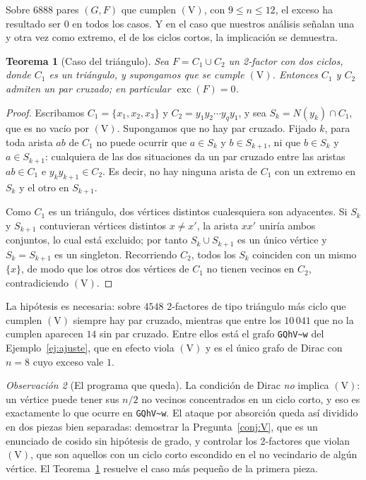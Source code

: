 \documentclass[11pt,a4paper]{article}
\newtheorem{teorema}{Teorema}[section]
\theoremstyle{definition}
\theoremstyle{remark}
\newtheorem{observacion}[teorema]{Observación}
\begin{document}
Sobre $6888$ pares $(G,F)$ que cumplen $(\mathrm{V})$, con $9\le n\le12$, el exceso ha resultado ser $0$ en todos los casos. Y en el caso que nuestros análisis señalan una y otra vez como extremo, el de los ciclos cortos, la implicación se demuestra.

\begin{teorema}[Caso del triángulo]\label{thm:triangulocosido}
Sea $F=C_1\cup C_2$ un 2-factor con dos ciclos, donde $C_1$ es un triángulo, y supongamos que se cumple $(\mathrm{V})$. Entonces $C_1$ y $C_2$ admiten un par cruzado; en particular $\operatorname{exc}(F)=0$.
\end{teorema}

\begin{proof}
Escribamos $C_1=\{x_1,x_2,x_3\}$ y $C_2=y_1y_2\cdots y_qy_1$, y sea $S_k=N(y_k)\cap C_1$, que es no vacío por $(\mathrm{V})$. Supongamos que no hay par cruzado. Fijado $k$, para toda arista $ab$ de $C_1$ no puede ocurrir que $a\in S_k$ y $b\in S_{k+1}$, ni que $b\in S_k$ y $a\in S_{k+1}$: cualquiera de las dos situaciones da un par cruzado entre las aristas $ab\in C_1$ e $y_ky_{k+1}\in C_2$. Es decir, no hay ninguna arista de $C_1$ con un extremo en $S_k$ y el otro en $S_{k+1}$.

Como $C_1$ es un triángulo, dos vértices distintos cualesquiera son adyacentes. Si $S_k$ y $S_{k+1}$ contuvieran vértices distintos $x\neq x'$, la arista $xx'$ uniría ambos conjuntos, lo cual está excluido; por tanto $S_k\cup S_{k+1}$ es un único vértice y $S_k=S_{k+1}$ es un singleton. Recorriendo $C_2$, todos los $S_k$ coinciden con un mismo $\{x\}$, de modo que los otros dos vértices de $C_1$ no tienen vecinos en $C_2$, contradiciendo $(\mathrm{V})$.
\end{proof}

La hipótesis es necesaria: sobre $4548$ 2-factores de tipo triángulo más ciclo que cumplen $(\mathrm{V})$ siempre hay par cruzado, mientras que entre los $10\,041$ que no la cumplen aparecen $14$ sin par cruzado. Entre ellos está el grafo \texttt{GQhV\~{}w} del Ejemplo~\ref{ej:ajuste}, que en efecto viola $(\mathrm{V})$ y es el único grafo de Dirac con $n=8$ cuyo exceso vale $1$.

\begin{observacion}[El programa que queda]\label{obs:programa}
La condición de Dirac \emph{no} implica $(\mathrm{V})$: un vértice puede tener sus $n/2$ no vecinos concentrados en un ciclo corto, y eso es exactamente lo que ocurre en \texttt{GQhV\~{}w}. El ataque por absorción queda así dividido en dos piezas bien separadas: demostrar la Pregunta~\ref{conj:V}, que es un enunciado de cosido sin hipótesis de grado, y controlar los 2-factores que violan $(\mathrm{V})$, que son aquellos con un ciclo corto escondido en el no vecindario de algún vértice. El Teorema~\ref{thm:triangulocosido} resuelve el caso más pequeño de la primera pieza.
\end{observacion}
\end{document}
